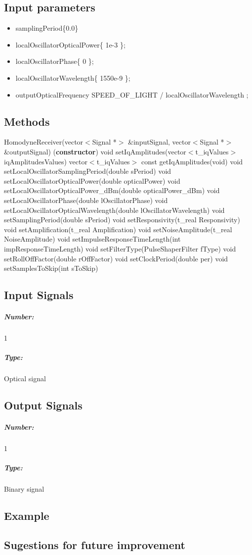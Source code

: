 \documentclass[a4paper]{article}
\begin{document}
\subsection*{Input parameters}

	\begin{itemize}
		\item samplingPeriod\{0.0\}
		\item localOscillatorOpticalPower\{ 1e-3 \};
		\item localOscillatorPhase\{ 0 \};
		\item localOscillatorWavelength\{ 1550e-9 \};
		\item outputOpticalFrequency{ SPEED\_OF\_LIGHT / localOscillatorWavelength };
	\end{itemize}

\pagebreak

\subsection*{Methods}

HomodyneReceiver(vector$<$Signal *$>$ \&inputSignal, vector$<$Signal *$>$ \&outputSignal) (\textbf{constructor})
\bigbreak
void setIqAmplitudes(vector$<$t\_iqValues$>$ iqAmplitudesValues)
\bigbreak
vector$<$t\_iqValues$>$ const getIqAmplitudes(void) 
\bigbreak
void setLocalOscillatorSamplingPeriod(double sPeriod)
\bigbreak
void setLocalOscillatorOpticalPower(double opticalPower)
\bigbreak
void setLocalOscillatorOpticalPower\_dBm(double opticalPower\_dBm) 
\bigbreak
void setLocalOscillatorPhase(double lOscillatorPhase)
\bigbreak
void setLocalOscillatorOpticalWavelength(double lOscillatorWavelength) 
\bigbreak
void setSamplingPeriod(double sPeriod)
\bigbreak
void  setResponsivity(t\_real Responsivity)
\bigbreak 
void setAmplification(t\_real Amplification) 
\bigbreak
void setNoiseAmplitude(t\_real NoiseAmplitude) 
\bigbreak
void setImpulseResponseTimeLength(int impResponseTimeLength) 
\bigbreak
void setFilterType(PulseShaperFilter fType) 
\bigbreak
void setRollOffFactor(double rOffFactor) 
\bigbreak
void setClockPeriod(double per) 
\bigbreak
void setSamplesToSkip(int sToSkip) 

\pagebreak

\subsection*{Input Signals}

\subparagraph*{Number:} 1 

\subparagraph*{Type:} Optical signal 

\subsection*{Output Signals}

\subparagraph*{Number:} 1 

\subparagraph*{Type:} Binary signal 

\subsection*{Example} 

\subsection*{Sugestions for future improvement}
\end{document}
